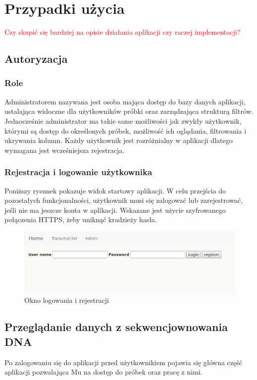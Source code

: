 \documentclass[a4paper,12pt,twoside]{article}
\begin{document}
\newpage
\section{Przypadki użycia}

\textcolor{red}{Czy skupić się bardziej na opisie działania aplikacji czy raczej implementacji?}
\subsection{Autoryzacja} 
\subsubsection{Role}
Administratorem nazywana jest osoba mająca dostęp do bazy danych aplikacji, ustalająca
widoczne dla użytkowników próbki oraz zarządzająca strukturą filtrów. 
Jednocześnie administrator ma takie same możliwości jak zwykły użytkownik, którymi są dostęp do określonych próbek, możliwość ich oglądania, filtrowania i  ukrywania kolumn. 
Każdy użytkownik jest rozróżnialny w aplikacji dlatego wymagana jest wcześniejsza rejestracja.
 
\subsubsection{Rejestracja i logowanie użytkownika}
Poniższy rysunek pokazuje widok startowy aplikacji. W celu przejścia do 
pozostałych funkcjonalności, użytkownik musi się zalogować lub zarejestrować, jeśli nie ma jeszcze 
konta w aplikacji. Wskazane jest użycie szyfrowanego połączenia HTTPS, żeby uniknąć 
kradzieży hasła.

\begin{figure}[h!]
  \includegraphics[width=\linewidth]{obrazy/aplikacja/login.png}
  \caption{Okno logowania i rejestracji}
  \label{fig:loginpic}
\end{figure}

\newpage  
\subsection{Przeglądanie danych z sekwencjownowania DNA} \label{sssec:dnaPage}
Po zalogowaniu się do aplikacji przed użytkownikiem pojawia się główna część aplikacji pozwalająca Mu 
na dostęp do próbek oraz pracę z nimi. 
 
\end{document}
